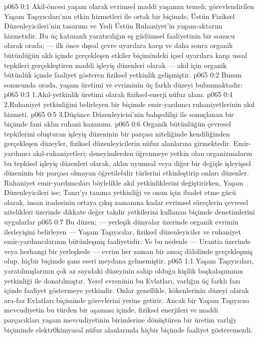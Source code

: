 \vs p065 0:1 Akil\hyp{}öncesi yaşam olarak evrimsel maddi yaşamın temeli; görevlendirilen Yaşam Taşıyıcıları’nın etkin hizmetleri ile ortak bir biçimde, Üstün Fiziksel Düzenleyicileri’nin tasarımı ve Yedi Üstün Ruhaniyet’in yaşam\hyp{}aktarım hizmetidir. Bu üç katmanlı yaratıcılığın eş güdümsel faaliyetinin bir sonucu olarak orada; --- ilk önce dışsal çevre uyarılara karşı ve daha sonra organik bütünlüğün aklı içinde gerçekleşen etkiler biçimindeki içsel uyarılara karşı ussal tepkileri gerçekleştiren maddi işleyiş düzenleri olarak --- akıl için organik bütünlük içinde faaliyet gösteren fiziksel yetkinlik gelişmiştir.
\vs p065 0:2 Bunun sonucunda orada, yaşam üretimi ve evriminin üç farklı düzeyi bulunmaktadır:
\vs p065 0:3 1.\bibnobreakspace Akıl\hyp{}yetkinlik üretimi olarak fiziksel\hyp{}enerji nüfuz alanı.
\vs p065 0:4 2.\bibnobreakspace Ruhaniyet yetkinliğini belirleyen bir biçimde emir\hyp{}yardımcı ruhaniyetlerinin akıl hizmeti.
\vs p065 0:5 3.\bibnobreakspace Düşünce Düzenleyicisi’nin bahşedilişi ile sonuçlanan bir biçimde fani aklın ruhani kazanımı.
\vs p065 0:6 Organik bütünlüğün çevresel tepkilerini oluşturan işleyiş düzeninin bir parçası niteliğinde kendiliğinden gerçekleşen düzeyler, fiziksel düzenleyicilerin nüfuz alanlarına girmektedir. Emir\hyp{}yardımcı akıl\hyp{}ruhaniyetleri; deneyimlerden öğrenmeye yetkin olan organizmaların bu tepkisel işleyiş düzenleri olarak, aklın uyumsal veya diğer bir değişle işleyişsel düzeninin bir parçası olmayan öğretilebilir türlerini etkinleştirip onları düzenler. Ruhaniyet emir\hyp{}yardımcıları böylelikle akıl yetkinliklerini değiştirirken, Yaşam Düzenleyicileri ise; Tanrı’yı tanıma yetkinliği ve onun için ibadet etme gücü olarak, insan iradesinin ortaya çıkış zamanına kadar evrimsel süreçlerin çevresel nitelikleri üzerinde dikkate değer takdir yetkilerini kullanan biçimde denetimlerini uygularlar
\vs p065 0:7 Bu düzen; --- yerleşik dünyalar üzerinde organik evrimin ilerleyişini belirleyen --- Yaşam Taşıyıcılar, fiziksel düzenleyiciler ve ruhaniyet emir\hyp{}yardımcılarının bütünleşmiş faaliyetidir. Ve bu nedenle --- Urantia üzerinde veya herhangi bir yerleşkede --- evrim her zaman bir amaç dâhilinde gerçekleşmiş olup, hiçbir biçimde şans eseri meydana gelmemiştir.
\vs p065 1:1 Yaşam Taşıyıcıları, yaratılmışlarının çok az sayıdaki düzeyinin sahip olduğu kişilik başkalaşımının yetkinliği ile donatılmıştır. Yerel evreninin bu Evlatları, varlığın üç farklı fazı içinde faaliyet göstermeye yetkindir. Onlar genellikle, kökenlerinin düzeyi olarak ara\hyp{}faz Evlatları biçiminde görevlerini yerine getirir. Ancak bir Yaşam Taşıyıcısı mevcudiyetin bu türden bir aşaması içinde, fiziksel enerjileri ve maddi parçacıkları yaşam mevcudiyetinin birimlerine dönüştüren bir üretim varlığı biçiminde elektr0kimyasal nüfuz alanlarında hiçbir biçimde faaliyet gösteremezdi.
